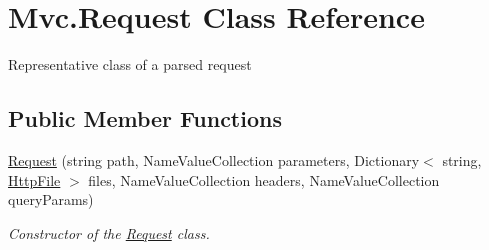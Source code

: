 \hypertarget{class_mvc_1_1_request}{}\section{Mvc.\+Request Class Reference}
\label{class_mvc_1_1_request}


Representative class of a parsed request  


\subsection*{Public Member Functions}
\begin{DoxyCompactItemize}
\item 
\hyperlink{class_mvc_1_1_request_a8d03461379f0d929fb86b39dd078f458}{Request} (string path, Name\+Value\+Collection parameters, Dictionary$<$ string, \hyperlink{class_mvc_1_1_http_file}{Http\+File} $>$ files, Name\+Value\+Collection headers, Name\+Value\+Collection query\+Params)
\begin{DoxyCompactList}\small\item\em Constructor of the \hyperlink{class_mvc_1_1_request}{Request} class. \end{DoxyCompactList}\end{DoxyCompactItemize}
